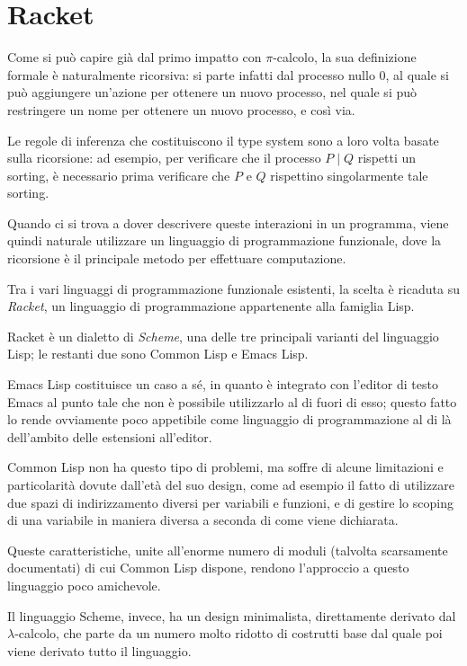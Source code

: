 \section{Racket}

Come si pu\`o capire gi\`a dal primo impatto con $\pi$-calcolo, la sua
definizione formale \`e naturalmente ricorsiva: si parte infatti dal
processo nullo $0$, al quale si pu\`o aggiungere un'azione per ottenere
un nuovo processo, nel quale si pu\`o restringere un nome per ottenere un
nuovo processo, e cos\`i via.

Le regole di inferenza che costituiscono il type system sono a loro volta
basate sulla ricorsione: ad esempio, per verificare che il processo
$P \; | \; Q$ rispetti un sorting, \`e necessario prima verificare che
$P$ e $Q$ rispettino singolarmente tale sorting.

Quando ci si trova a dover descrivere queste interazioni in un programma,
viene quindi naturale utilizzare un linguaggio di programmazione
funzionale, dove la ricorsione \`e il principale metodo per effettuare
computazione.

Tra i vari linguaggi di programmazione funzionale esistenti, la scelta
\`e ricaduta su \emph{Racket}, un linguaggio di programmazione
appartenente alla famiglia Lisp.

Racket \`e un dialetto di \emph{Scheme}, una delle tre principali
varianti del linguaggio Lisp; le restanti due sono Common Lisp e Emacs
Lisp.

Emacs Lisp costituisce un caso a s\'e, in quanto \`e integrato con
l'editor di testo Emacs al punto tale che non \`e possibile
utilizzarlo al di fuori di esso; questo fatto lo rende ovviamente poco
appetibile come linguaggio di programmazione al di l\`a dell'ambito
delle estensioni all'editor.

Common Lisp non ha questo tipo di problemi, ma soffre di alcune
limitazioni e particolarit\`a dovute dall'et\`a del suo design, come
ad esempio il fatto di utilizzare due spazi di indirizzamento diversi
per variabili e funzioni, e di gestire lo scoping di una variabile in
maniera diversa a seconda di come viene dichiarata.

Queste caratteristiche, unite all'enorme numero di moduli (talvolta
scarsamente documentati) di cui Common Lisp dispone, rendono l'approccio
a questo linguaggio poco amichevole.

Il linguaggio Scheme, invece, ha un design minimalista, direttamente
derivato dal $\lambda$-calcolo, che parte da un numero molto ridotto di
costrutti base dal quale poi viene derivato tutto il linguaggio.

